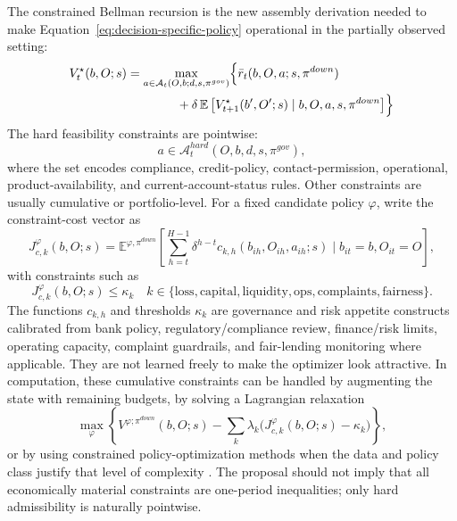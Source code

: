 \documentclass[11pt]{article}
\newcommand{\E}{\mathbb{E}}
\newcommand{\1}{\mathbf{1}}
\begin{document}
The constrained Bellman recursion is the new assembly derivation needed to make
Equation~\eqref{eq:decision-specific-policy} operational in the partially
observed setting:
\begin{align}
  V_t^{\star}(b,O;s)
  &=
  \max_{a\in\mathcal{A}_{t}(O,b;d,s,\pi^{gov})}
  \Bigl\{
    \bar r_t(b,O,a;s,\pi^{down})
    \nonumber\\
    &\qquad\qquad
    + \delta\,\E\left[V_{t+1}^{\star}(b',O';s)\mid b,O,a,s,\pi^{down}\right]
  \Bigr\}
  \label{eq:ss-bellman}
\end{align}
The hard feasibility constraints are pointwise:
\begin{equation}
  a\in \mathcal{A}^{hard}_{t}(O,b,d,s,\pi^{gov}),
  \label{eq:ss-hard-feasible}
\end{equation}
where the set encodes compliance, credit-policy, contact-permission, operational,
product-availability, and current-account-status rules. Other constraints are
usually cumulative or portfolio-level. For a fixed candidate policy $\varphi$,
write the constraint-cost vector as
\begin{equation}
  J^{\varphi}_{c,k}(b,O;s)
  =
  \E^{\varphi,\pi^{down}}\!\left[
    \sum_{h=t}^{H-1}\delta^{h-t}
    c_{k,h}(b_{ih},O_{ih},a_{ih};s)
    \mid b_{it}=b,O_{it}=O
  \right],
  \label{eq:ss-cumulative-constraint}
\end{equation}
with constraints such as
\begin{equation}
  J^{\varphi}_{c,k}(b,O;s)\le \kappa_k
  \quad
  k\in\{\mathrm{loss},\mathrm{capital},\mathrm{liquidity},
  \mathrm{ops},\mathrm{complaints},\mathrm{fairness}\}.
  \label{eq:ss-cmdp-constraints}
\end{equation}
The functions $c_{k,h}$ and thresholds $\kappa_k$ are governance and risk
appetite constructs calibrated from bank policy, regulatory/compliance review,
finance/risk limits, operating capacity, complaint guardrails, and fair-lending
monitoring where applicable. They are not learned freely to make the optimizer
look attractive.
In computation, these cumulative constraints can be handled by augmenting the
state with remaining budgets, by solving a Lagrangian relaxation
\begin{equation}
  \max_{\varphi}
  \left\{
    V^{\varphi;\pi^{down}}(b,O;s)
    -
    \sum_k \lambda_k\bigl(J^{\varphi}_{c,k}(b,O;s)-\kappa_k\bigr)
  \right\},
  \label{eq:ss-lagrangian-cmdp}
\end{equation}
or by using constrained policy-optimization methods when the data and policy
class justify that level of complexity \citep{achiam2017cpo}. The proposal should
not imply that all economically material constraints are one-period inequalities;
only hard admissibility is naturally pointwise.
\end{document}
